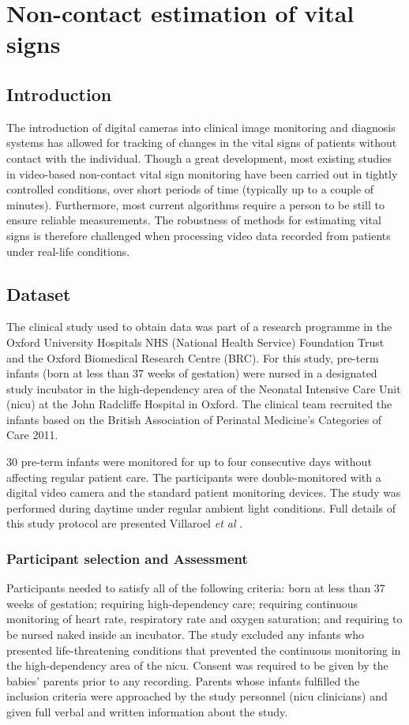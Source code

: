 \setlength{\parskip}{\baselineskip}
\chapter{Non-contact estimation of vital signs}
\section{Introduction} 
The introduction of digital cameras into clinical image monitoring and diagnosis systems has allowed for tracking of changes in the vital signs of patients without contact with the individual. Though a great development, most existing studies in video-based non-contact vital sign monitoring have been carried out in tightly controlled conditions, over short periods of time (typically up to a couple of minutes). Furthermore, most current algorithms require a person to be still to ensure reliable measurements. The robustness of methods for estimating vital signs is therefore challenged when processing video data recorded from patients under real-life conditions.

\section{Dataset}
The clinical study used to obtain data was part of a research programme in the Oxford University Hospitals NHS (National Health Service) Foundation Trust and the Oxford Biomedical Research Centre (BRC). For this study, pre-term infants (born at less than 37 weeks of gestation) were nursed in a designated study incubator in the high-dependency area of the Neonatal Intensive Care Unit (\gls{nicu}) at the John Radcliffe Hospital in Oxford. The clinical team recruited the infants based on the British Association of Perinatal Medicine's Categories of Care 2011. 

30 pre-term infants were monitored for up to four consecutive days without affecting regular patient care. The participants were double-monitored with a digital video camera and the standard patient monitoring devices. The study was performed during daytime under regular ambient light conditions. Full details of this study protocol are presented Villaroel \textit{et al} \cite{villarroel2019non}.

\subsection{Participant selection and Assessment}
Participants needed to satisfy all of the following criteria: born at less than 37 weeks of gestation; requiring high-dependency care; requiring continuous monitoring of heart rate, respiratory rate and oxygen saturation; and requiring to be nursed naked inside an incubator. The study excluded any infants who presented life-threatening conditions that prevented the continuous monitoring in the high-dependency area of the \gls{nicu}. Consent was required to be given by the babies’ parents prior to any recording. Parents whose infants fulfilled the inclusion criteria were approached by the study personnel (\gls{nicu} clinicians) and given full verbal and written information about the study.

